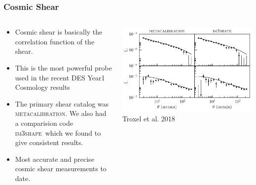 \documentclass[aspectratio=169]{beamer}
\newcommand{\mcal}{\textsc{metacalibration}}
\newcommand{\imshape}{\textsc{im3shape}}
\begin{document}
{\begin{columns}
    \end{columns}

}

\frame
{

    \frametitle{Cosmic Shear}


    \begin{columns}
        \begin{column}{0.5\textwidth}
            \begin{itemize}

                \item Cosmic shear is basically the correlation
                    function of the shear.

                \item This is the most powerful probe used in the
                    recent DES Year1 Cosmology results

                \item The primary shear catalog was \mcal.  We also
                    had a comparision code \imshape\ which we
                    found to give consistent results.

                \item Most accurate and precise cosmic shear measurements to
                    date.

            \end{itemize}

        \end{column}
        \begin{column}{0.5\textwidth}
            \centering
                \includegraphics[width=\linewidth]{xi_notomo.pdf}
                \newline
                {\tiny Troxel et al. 2018}
        \end{column}

    \end{columns}

}
\end{document}
